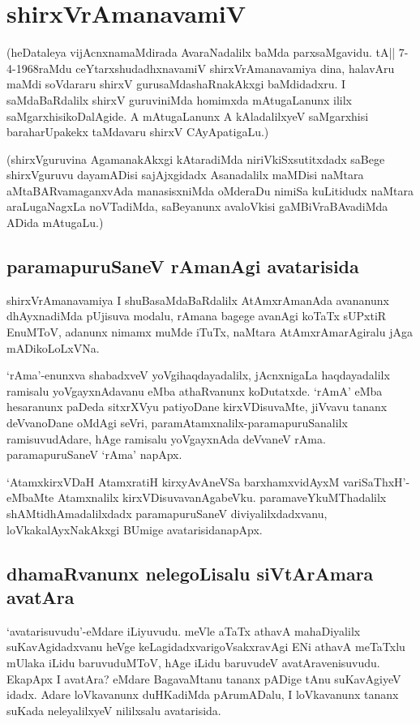 \chapter{shirxVrAmanavamiV} 

(heDataleya vijAcnxnamaMdirada AvaraNadalilx baMda parxsaMgavidu. tA|| 7-4-1968raMdu ceYtarxshudadhxnavamiV shirxVrAmanavamiya dina, halavAru maMdi soVdararu shirxV gurusaMdashaRnakAkxgi baMdidadxru. I saMdaBaRdalilx shirxV guruviniMda homimxda mAtugaLanunx ililx saMgarxhisikoDalAgide. A mAtugaLanunx A kAladalilxyeV saMgarxhisi baraharUpakekx taMdavaru shirxV CAyApatigaLu.) 

(shirxVguruvina AgamanakAkxgi kAtaradiMda niriVkiSxsutitxdadx saBege shirxVguruvu dayamADisi sajAjxgidadx Asanadalilx maMDisi naMtara aMtaBARvamaganxvAda manasisxniMda oMderaDu nimiSa kuLitidudx naMtara araLugaNagxLa noVTadiMda, saBeyanunx avaloVkisi gaMBiVraBAvadiMda ADida mAtugaLu.) 

\section*{paramapuruSaneV rAmanAgi avatarisida}

shirxVrAmanavamiya I shuBasaMdaBaRdalilx AtAmxrAmanAda avananunx dhAyxnadiMda pUjisuva modalu, rAmana bagege avanAgi koTaTx sUPxtiR EnuMToV, adanunx nimamx muMde iTuTx, naMtara AtAmxrAmarAgiralu jAga mADikoLoLxVNa. 

`rAma'-enunxva shabadxveV yoVgihaqdayadalilx, jAcnxnigaLa haqdayadalilx ramisalu yoVgayxnAdavanu eMba athaRvanunx koDutatxde. `rAmA' eMba hesaranunx paDeda sitxrXVyu patiyoDane kirxVDisuvaMte, jiVvavu tananx deVvanoDane oMdAgi seVri, paramAtamxnalilx-paramapuruSanalilx ramisuvudAdare, hAge ramisalu yoVgayxnAda deVvaneV rAma. paramapuruSaneV `rAma' napApx. 

`AtamxkirxVDaH AtamxratiH\label{143} kirxyAvAneVSa barxhamxvidAyxM variSaThxH'-eMbaMte Atamxnalilx kirxVDisuvavanAgabeVku. paramaveYkuMThadalilx shAMtidhAmadalilxdadx paramapuruSaneV diviyalilxdadxvanu, loVkakalAyxNakAkxgi BUmige avatarisidanapApx. 

\section*{dhamaRvanunx nelegoLisalu siVtArAmara avatAra}

`avatarisuvudu'-eMdare iLiyuvudu. meVle aTaTx athavA mahaDiyalilx suKavAgidadxvanu heVge keLagidadxvarigoVsakxravAgi ENi athavA meTaTxlu mUlaka iLidu baruvuduMToV, hAge iLidu baruvudeV avatAravenisuvudu. EkapApx I avatAra? eMdare BagavaMtanu tananx pADige tAnu suKavAgiyeV idadx. Adare loVkavanunx duHKadiMda pArumADalu, I loVkavanunx tananx suKada neleyalilxyeV nililxsalu avatarisida. 

